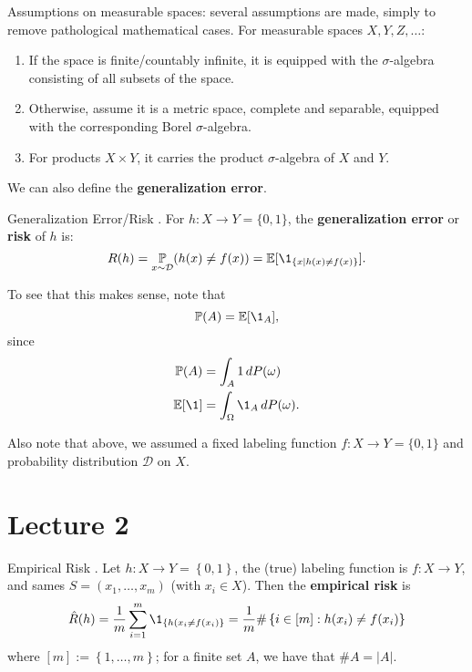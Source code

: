 \documentclass{article}
\begin{document}
Assumptions on measurable spaces: several assumptions are made, simply to remove pathological mathematical cases. For measurable spaces $X, Y, Z, \dots$:
\begin{enumerate}
\item If the space is finite/countably infinite, it is equipped with the $\sigma$-algebra consisting of all subsets of the space.
\item Otherwise, assume it is a metric space, complete and separable, equipped with the corresponding Borel $\sigma$-algebra.
\item For products $X \times Y$, it carries the product $\sigma$-algebra of $X$ and $Y$. 
\end{enumerate}

We can also define the \textbf{generalization error}.

\begin{Definition}{Generalization Error/Risk}
. For $h : X \rightarrow Y = \{ 0 , 1 \}$, the \textbf{generalization error} or \textbf{risk} of $h$ is:
\begin{equation}
  R(h) = \underset{x \sim \mathcal{D}}{\bP} (h(x) \neq f(x)) = \bE [ \1_{\{x | h(x) \neq f(x) \} } ].
\end{equation}
\end{Definition}

To see that this makes sense, note that 
\begin{equation}
\label{eq:1}
  \bP (A) = \bE[\1_A],
\end{equation}
since
\begin{align}
\label{eq:2}
  \bP (A) &= \int_A 1 \, dP(\omega) \\
  \bE [\1] &= \int_{\Omega} \1_A \, dP(\omega).
\end{align}

Also note that above, we assumed a fixed labeling function $f: X \rightarrow Y = \{ 0 , 1 \}$ and probability distribution $\mathcal{D}$ on $X$.

\section{Lecture 2}

\begin{Definition}{Empirical Risk}
.  Let $h: X \rightarrow Y = \left\{ 0, 1 \right\}$, the (true) labeling function is $f : X \rightarrow Y$, and sames $S = (x_1, \dots, x_m)$ (with $x_i \in X$). Then the \textbf{empirical risk} is
\begin{equation}
  \hat{R}(h) = \frac{1}{m} \sum\limits_{i = 1}^m \1_{\left\{ h(x_i \neq f(x_i) \right\}} = \frac{1}{m} \# \left\{ i \in [m] : h(x_i) \neq f(x_i) \right\}
\end{equation}
where $[m] := \left\{ 1, \dots, m \right\}$; for a finite set $A$, we have that $\# A = |A|$.
\end{Definition}
\end{document}
